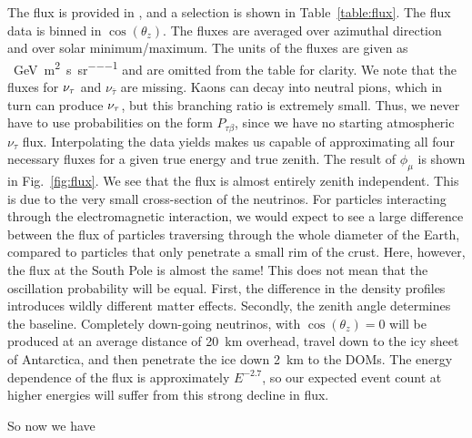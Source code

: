 The flux is provided in \cite{hondaData,hondaArticle}, and a selection is shown in Table~\ref{table:flux}.
The flux data is binned in $\cos(\theta_z)$. The fluxes are averaged over azimuthal direction and over solar minimum/maximum. 
The units of the fluxes are given as \si{\per\GeV \per\metre\squared \per\second \per\steradian} and are omitted
from the table for clarity. 
We note that the fluxes for $\nu_\tau$ and $\nu_{\bar{\tau}}$ are missing. Kaons can decay into neutral pions, which in turn 
can produce $\nu_\tau$, but this branching ratio is extremely small. Thus, we never have to use probabilities on the form 
$P_{\tau \beta}$, since we have no starting atmospheric $\nu_\tau$ flux. 
Interpolating the data yields makes us capable of approximating all four necessary fluxes for a given true energy and true zenith.
The result of $\phi_\mu$ is shown in Fig.~\ref{fig:flux}. We see that the flux is almost entirely zenith independent. This is due to the 
very small cross-section of the neutrinos. For particles interacting through the electromagnetic interaction, we would expect to see a 
large difference between the flux of particles traversing through the whole diameter of the Earth, compared to particles that only penetrate a 
small rim of the crust. Here, however, the flux at the South Pole is almost the same! This does not mean that the oscillation probability will be 
equal. First, the difference in the density profiles introduces wildly different matter effects. 
Secondly, the zenith angle determines the baseline. Completely down-going neutrinos, with $\cos(\theta_z) = 0$ will be produced at an average distance of \SI{20}{\km}
overhead, travel down to the icy sheet of Antarctica, and then penetrate the ice down \SI{2}{\km} to the DOMs. 
The energy dependence of the flux is approximately $E^{-2.7}$, so our expected event count at higher energies will suffer from this strong decline in flux.

So now we have 

